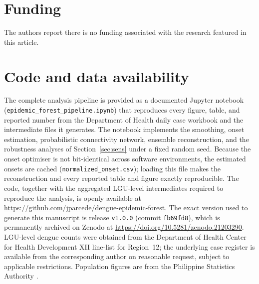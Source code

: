 \documentclass[a4paper,11pt]{article}
\begin{document}
\section*{Funding}
The authors report there is no funding associated with the research featured in
this article.

\section*{Code and data availability}
The complete analysis pipeline is provided as a documented Jupyter notebook
(\texttt{epidemic\_\allowbreak forest\_\allowbreak pipeline\allowbreak.ipynb}) that reproduces every figure, table, and
reported number from the Department of Health daily case workbook and the
intermediate files it generates. The notebook implements the smoothing, onset
estimation, probabilistic connectivity network, ensemble reconstruction, and the
robustness analyses of Section~\ref{sec:sens} under a fixed random seed. Because the
onset optimiser is not bit-identical across software environments, the estimated
onsets are cached (\texttt{normalized\_onset.csv}); loading this file makes the
reconstruction and every reported table and figure exactly reproducible.
The code, together with the aggregated LGU-level intermediates required to reproduce
the analysis, is openly available at
\url{https://github.com/jparcede/dengue-epidemic-forest}. The exact version used to
generate this manuscript is release \texttt{v1.0.0} (commit \texttt{fb69fd8}), which
is permanently archived on Zenodo at
\url{https://doi.org/10.5281/zenodo.21203290}. LGU-level dengue counts
were obtained from the Department of Health Center for Health Development XII
line-list for Region~12; the underlying case register is available from the
corresponding author on reasonable request, subject to applicable restrictions.
Population figures are from the Philippine Statistics Authority \cite{PSA2015}.

\end{document}
